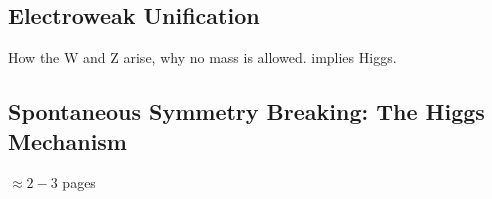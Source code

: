 \subsection{Electroweak Unification}
How the W and Z arise, why no mass is allowed.
implies Higgs.

\subsection{Spontaneous Symmetry Breaking: The Higgs Mechanism}
$\approx 2-3$ pages

